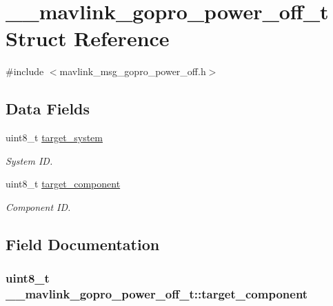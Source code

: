 \hypertarget{struct____mavlink__gopro__power__off__t}{\section{\+\_\+\+\_\+mavlink\+\_\+gopro\+\_\+power\+\_\+off\+\_\+t Struct Reference}
\label{struct____mavlink__gopro__power__off__t}
}


{\ttfamily \#include $<$mavlink\+\_\+msg\+\_\+gopro\+\_\+power\+\_\+off.\+h$>$}

\subsection*{Data Fields}
\begin{DoxyCompactItemize}
\item 
uint8\+\_\+t \hyperlink{struct____mavlink__gopro__power__off__t_ace6f688f8ee0583a4f80ca9f65b3bab8}{target\+\_\+system}
\begin{DoxyCompactList}\small\item\em System I\+D. \end{DoxyCompactList}\item 
uint8\+\_\+t \hyperlink{struct____mavlink__gopro__power__off__t_ada39040c5a83c16ebd5f79523fc1b185}{target\+\_\+component}
\begin{DoxyCompactList}\small\item\em Component I\+D. \end{DoxyCompactList}\end{DoxyCompactItemize}


\subsection{Field Documentation}
\hypertarget{struct____mavlink__gopro__power__off__t_ada39040c5a83c16ebd5f79523fc1b185}{
\subsubsection[{target\+\_\+component}]{\setlength{\rightskip}{0pt plus 5cm}uint8\+\_\+t \+\_\+\+\_\+mavlink\+\_\+gopro\+\_\+power\+\_\+off\+\_\+t\+::target\+\_\+component}}\label{struct____mavlink__gopro__power__off__t_ada39040c5a83c16ebd5f79523fc1b185}


